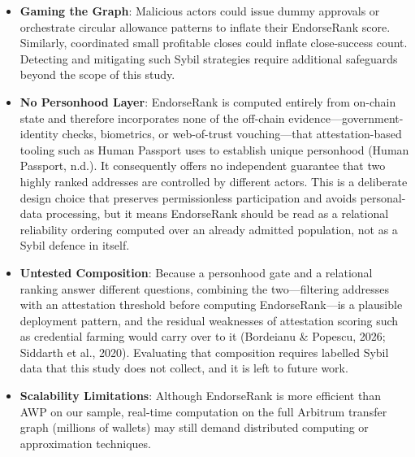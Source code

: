 \begin{itemize}
\item[\textbullet] \textbf{Gaming the Graph}: Malicious actors could issue dummy approvals or orchestrate circular allowance patterns to inflate their EndorseRank score. Similarly, coordinated small profitable closes could inflate close-success count. Detecting and mitigating such Sybil strategies require additional safeguards beyond the scope of this study.
\item[\textbullet] \textbf{No Personhood Layer}: EndorseRank is computed entirely from on-chain state and therefore incorporates none of the off-chain evidence---government-identity checks, biometrics, or web-of-trust vouching---that attestation-based tooling such as Human Passport uses to establish unique personhood (Human Passport, n.d.). It consequently offers no independent guarantee that two highly ranked addresses are controlled by different actors. This is a deliberate design choice that preserves permissionless participation and avoids personal-data processing, but it means EndorseRank should be read as a relational reliability ordering computed over an already admitted population, not as a Sybil defence in itself.
\item[\textbullet] \textbf{Untested Composition}: Because a personhood gate and a relational ranking answer different questions, combining the two---filtering addresses with an attestation threshold before computing EndorseRank---is a plausible deployment pattern, and the residual weaknesses of attestation scoring such as credential farming would carry over to it (Bordeianu \& Popescu, 2026; Siddarth et al., 2020). Evaluating that composition requires labelled Sybil data that this study does not collect, and it is left to future work.
\end{itemize}

\begin{itemize}
\item[\textbullet] \textbf{Scalability Limitations}: Although EndorseRank is more efficient than AWP on our sample, real-time computation on the full Arbitrum transfer graph (millions of wallets) may still demand distributed computing or approximation techniques.
\end{itemize}
